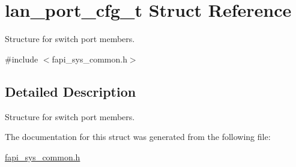 \hypertarget{structlan__port__cfg__t}{\section{lan\-\_\-port\-\_\-cfg\-\_\-t Struct Reference}
\label{structlan__port__cfg__t}
}


Structure for switch port members.  




{\ttfamily \#include $<$fapi\-\_\-sys\-\_\-common.\-h$>$}



\subsection{Detailed Description}
Structure for switch port members. 

The documentation for this struct was generated from the following file\-:\begin{DoxyCompactItemize}
\item 
\hyperlink{fapi__sys__common_8h}{fapi\-\_\-sys\-\_\-common.\-h}\end{DoxyCompactItemize}
